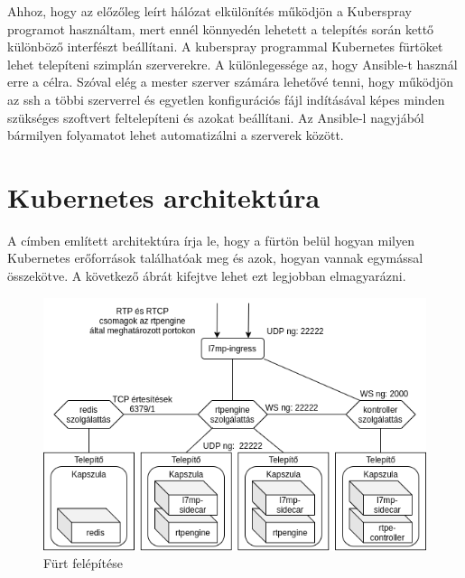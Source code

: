 Ahhoz, hogy az előzőleg leírt hálózat elkülönítés működjön a Kuberspray programot 
használtam, mert ennél könnyedén lehetett a telepítés során kettő különböző interfészt
beállítani. A kuberspray programmal Kubernetes fürtöket lehet telepíteni szimplán
szerverekre. A különlegessége az, hogy Ansible-t használ erre a célra. Szóval elég
a mester szerver számára lehetővé tenni, hogy működjön az ssh a többi szerverrel és
egyetlen konfigurációs fájl indításával képes minden szükséges szoftvert feltelepíteni
és azokat beállítani. Az Ansible-l nagyjából bármilyen folyamatot lehet automatizálni a
szerverek között. 

\section{Kubernetes architektúra}

A címben említett architektúra írja le, hogy a fürtön belül hogyan milyen Kubernetes
erőforrások találhatóak meg és azok, hogyan vannak egymással összekötve. A következő
ábrát kifejtve lehet ezt legjobban elmagyarázni.

\begin{figure}[!ht]
	\centering
	\includegraphics[width=1\textwidth, keepaspectratio]{figures/cluster.png}
	\caption{Fürt felépítése}
	\label{fig:HVSpaces}
\end{figure}

